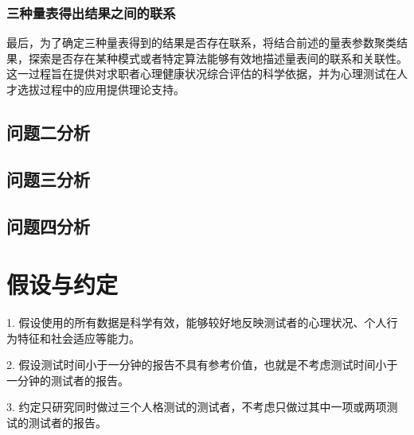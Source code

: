 \documentclass[withoutpreface,bwprint]{cumcmthesis} %
\begin{document}
\subsubsection*{三种量表得出结果之间的联系}

最后，为了确定三种量表得到的结果是否存在联系，将结合前述的量表参数聚类结果，探索是否存在某种模式或者特定算法能够有效地描述量表间的联系和关联性。这一过程旨在提供对求职者心理健康状况综合评估的科学依据，并为心理测试在人才选拔过程中的应用提供理论支持。

\subsection{问题二分析}

\subsection{问题三分析}

\subsection{问题四分析}

\section{假设与约定}
1. 假设使用的所有数据是科学有效，能够较好地反映测试者的心理状况、个人行为特征和社会适应等能力。

2. 假设测试时间小于一分钟的报告不具有参考价值，也就是不考虑测试时间小于一分钟的测试者的报告。

3. 约定只研究同时做过三个人格测试的测试者，不考虑只做过其中一项或两项测试的测试者的报告。
\end{document}
